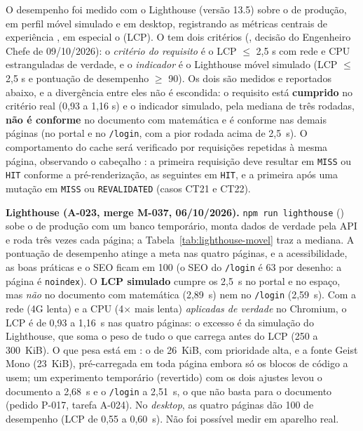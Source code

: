 O desempenho foi medido com o Lighthouse \cite{lighthouse} (versão 13.5) sobre o  de produção, em perfil móvel simulado e em desktop, registrando as métricas centrais de experiência \cite{webvitals}, em especial o  (LCP). O  tem dois critérios (, decisão do Engenheiro Chefe de 09/10/2026): o \emph{critério do requisito} é o LCP $\leq$ 2,5 s com rede e CPU estranguladas de verdade, e o \emph{indicador} é o Lighthouse móvel simulado (LCP $\leq$ 2,5 s e pontuação de desempenho $\geq$ 90). Os dois são medidos e reportados abaixo, e a divergência entre eles não é escondida: o requisito está \textbf{cumprido} no critério real (0,93 a 1,16 s) e o indicador simulado, pela mediana de três rodadas, \textbf{não é conforme} no documento com matemática e é conforme nas demais páginas (no portal e no \texttt{/login}, com a pior rodada acima de 2,5~s). O comportamento do cache será verificado por requisições repetidas à mesma página, observando o cabeçalho : a primeira requisição deve resultar em \texttt{MISS} ou \texttt{HIT} conforme a pré-renderização, as seguintes em \texttt{HIT}, e a primeira após uma mutação em \texttt{MISS} ou \texttt{REVALIDATED} (casos CT21 e CT22).

\textbf{Lighthouse (A-023, merge M-037, 06/10/2026).} \texttt{npm run lighthouse} () sobe o  de produção com um banco temporário, monta dados de verdade pela API e roda três vezes cada página; a Tabela~\ref{tab:lighthouse-movel} traz a mediana. A pontuação de desempenho atinge a meta nas quatro páginas, e a acessibilidade, as boas práticas e o SEO ficam em 100 (o SEO do \texttt{/login} é 63 por desenho: a página é \texttt{noindex}). O \textbf{LCP simulado} cumpre os 2,5~s no portal e no espaço, mas \emph{não} no documento com matemática (2,89~s) nem no \texttt{/login} (2,59~s). Com a rede (4G lenta) e a CPU (4$\times$ mais lenta) \emph{aplicadas de verdade} no Chromium, o LCP é de 0,93 a 1,16~s nas quatro páginas: o excesso é da simulação do Lighthouse, que soma o peso de tudo o que carrega antes do LCP (250 a 300~KiB). O que pesa está em : o  de 26~KiB, com prioridade alta, e a fonte Geist Mono (23~KiB), pré-carregada em toda página embora só os blocos de código a usem; um experimento temporário (revertido) com os dois ajustes levou o documento a 2,68~s e o \texttt{/login} a 2,51~s, o que não basta para o documento (pedido P-017, tarefa A-024). No \emph{desktop}, as quatro páginas dão 100 de desempenho (LCP de 0,55 a 0,60~s). Não foi possível medir em aparelho real.

